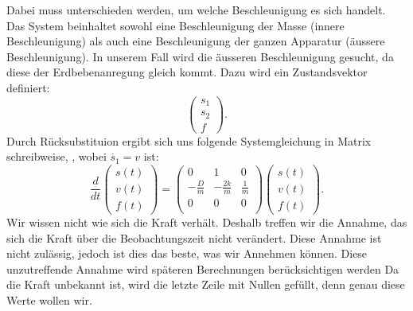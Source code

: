 Dabei muss unterschieden werden, um welche Beschleunigung es sich handelt.
Das System beinhaltet sowohl eine Beschleunigung der Masse (innere Beschleunigung) als auch eine Beschleunigung der ganzen Apparatur (äussere Beschleunigung). 
In unserem Fall wird die äusseren Beschleunigung gesucht, da diese der Erdbebenanregung gleich kommt.
Dazu wird ein Zustandsvektor definiert:
\[ 
 \left(\begin{array}{c} {s_1} \\ {s_2} \\ {f} \end{array}\right).
 \] 
Durch Rücksubstituion ergibt sich uns folgende Systemgleichung in Matrix schreibweise, , wobei $\dot {s_1}= v$ ist:
\begin{equation}
\frac{d}{dt} \left(\begin{array}{c} s(t) \\ v(t) \\ f(t) \end{array}\right) = \left(
 \begin{array}{ccc} 	
0 & 1& 0 \\ 
- \frac{D}{m} &-\frac{2k}{m} & \frac{1} {m}\\
0 & 0 & 0\\
\end{array}\right)  \left(\begin{array}{c} s(t)\\ v(t)\\ f(t) \end{array}\right).
\end{equation}
Wir wissen nicht wie sich die Kraft verhält. 
Deshalb treffen wir die Annahme, das sich die Kraft über die Beobachtungszeit nicht verändert.
Diese Annahme ist nicht zulässig, jedoch ist dies das beste, was wir Annehmen können. 
Diese unzutreffende Annahme wird späteren Berechnungen berücksichtigen werden
Da die Kraft unbekannt ist, wird die letzte Zeile mit Nullen gefüllt, denn genau diese Werte wollen wir. 











